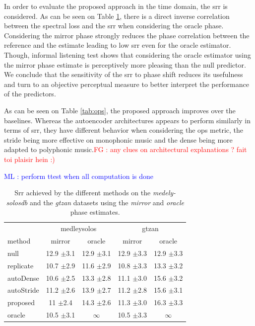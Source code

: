 \documentclass{article}
\newcommand{\ml}[1]{\textcolor{blue}{ML : #1}}
\newcommand{\fg}[1]{\textcolor{red}{FG : #1}}
\begin{document}
In order to evaluate the proposed approach in the time domain, the srr is considered. As can be seen on Table \ref{tab:srr}, there is a direct inverse correlation between the spectral loss and the srr when considering the oracle phase. Considering the mirror phase strongly reduces the phase correlation between the reference and the estimate leading to low srr even for the oracle estimator. Though, informal listening test shows that considering the oracle estimator using the mirror phase estimate is perceptively more pleasing than the null predictor. We conclude that the sensitivity of the srr to phase shift reduces its usefulness and turn to an objective perceptual measure to better interpret the performance of the predictors.

 As can be seen on Table \ref{tab:ops}, the proposed approach improves over the baselines. Whereas the autoencoder architectures appears to perform similarly in terms of srr, they have different behavior when considering the ops metric, the stride being more effective on monophonic music and the dense being more adapted to polyphonic music.\fg{any clues on architectural explanations ? fait toi plaisir hein :)}

 \ml{perform ttest when all computation is done}

\begin{table}
  \begin{center}
\begin{tabular}{lcc|cc}
  & \multicolumn{2}{c}{medleysolos} & \multicolumn{2}{c}{gtzan} \\
  method & mirror & oracle & mirror & oracle \\
\hline
null & 12.9 $\pm$3.1 & 12.9 $\pm$3.1 & 12.9 $\pm$3.3 &  12.9 $\pm$3.3\\
replicate & 10.7 $\pm$2.9 & 11.6 $\pm$2.9 & 10.8 $\pm$3.3 & 13.3 $\pm$3.2\\
\hline
autoDense & 10.6 $\pm$2.5 &  13.3 $\pm$2.8 & 11.1 $\pm$3.0 & 15.6 $\pm$3.2 \\
autoStride & 11.2 $\pm$2.6 & 13.9 $\pm$2.7 & 11.2 $\pm$2.8 & 15.6 $\pm$3.1 \\
\hline
proposed  & 11 $\pm$2.4 & 14.3 $\pm$2.6  & 11.3 $\pm$3.0 & 16.3 $\pm$3.3 \\
\hline
oracle & 10.5 $\pm$3.1 & $\infty$ & 10.5 $\pm$3.3 & $\infty$ \\
\end{tabular}
\caption{Srr achieved by the different methods on the \textit{medely-solosdb} and the \textit{gtzan} datasets using the \textit{mirror} and \textit{oracle} phase estimates.}
\label{tab:srr}
\end{center}
\vspace{-4mm}
\end{table}
\end{document}
